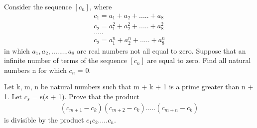 \item Consider the sequence $[c_n]$, where
\begin{align*}
c_1 = a_1 + a_2 +..... + a_8\\
c_2 = a_{1}^{2} + a_{2}^{2} +.....+ a_{8}^{2}\\
.....\\c_2 = a_{1}^{n} + a_{2}^{n} +.....+ a_{8}^{n}
\end{align*}
in which $a_1, a_2,......., a_8$ are real numbers not all equal to zero. Suppose that an infinite number of terms of the sequence $[c_n]$ are equal to zero. Find all natural numbers n for which $c_n$ = 0.\\
\item Let k, m, n be natural numbers such that m + k + 1 is a prime greater than
n + 1. Let $c_s$ = s(s + 1). Prove that the product
\begin{align*}
(c_{m+1} - c_{k})(c_{m+2} -  c_{k})..... (c_{m+n} - c_{k})
\end{align*}
is divisible by the product $c_1c_2.....c_n.$



